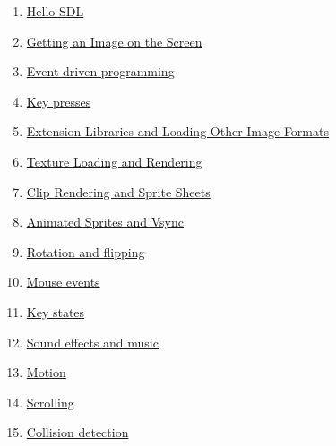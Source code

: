 \documentclass[11pt,fleqn]{book} %
\begin{document}
\begin{enumerate}
\color{black}
    \item \color{blue}\href{http://lazyfoo.net/tutorials/SDL/01_hello_SDL/index.php}{Hello SDL} \color{black}
    \item \color{blue} \href{http://lazyfoo.net/tutorials/SDL/02_getting_an_image_on_the_screen/index.php}{Getting an Image on the Screen} \color{black}
    \item \color{blue} \href{http://lazyfoo.net/tutorials/SDL/03_event_driven_programming/index.php}{Event driven programming} \color{black}
    \item \color{blue} \href{http://lazyfoo.net/tutorials/SDL/04_key_presses/index.php}{Key presses} \color{black}
    \item \color{blue} \href{http://lazyfoo.net/tutorials/SDL/06_extension_libraries_and_loading_other_image_formats/index.php}{Extension Libraries and Loading Other Image Formats} \color{black}
    \item \color{blue} \href{http://lazyfoo.net/tutorials/SDL/07_texture_loading_and_rendering/index.php}{Texture Loading and Rendering} \color{black}
    \item \color{blue} \href{http://lazyfoo.net/tutorials/SDL/11_clip_rendering_and_sprite_sheets/index.php}{Clip Rendering and Sprite Sheets} \color{black}
    \item \color{blue} \href{http://lazyfoo.net/tutorials/SDL/14_animated_sprites_and_vsync/index.php}{Animated Sprites and Vsync} \color{black}
    \item \color{blue} \href{http://lazyfoo.net/tutorials/SDL/15_rotation_and_flipping/index.php}{Rotation and flipping} \color{black}
    \item \color{blue} \href{http://lazyfoo.net/tutorials/SDL/17_mouse_events/index.php}{Mouse events} \color{black}
    \item \color{blue} \href{http://lazyfoo.net/tutorials/SDL/18_key_states/index.php}{Key states} \color{black}
    \item \color{blue} \href{http://lazyfoo.net/tutorials/SDL/21_sound_effects_and_music/index.php}{Sound effects and music} \color{black}
    \item \color{blue} \href{http://lazyfoo.net/tutorials/SDL/26_motion/index.php}{Motion} \color{black}
    \item \color{blue} \href{http://lazyfoo.net/tutorials/SDL/30_scrolling/index.php}{Scrolling} \color{black}
    \item \color{blue} \href{http://lazyfoo.net/tutorials/SDL/28_per-pixel_collision_detection/index.php}{Collision detection} \color{black}

\end{enumerate}
    
\end{document}
